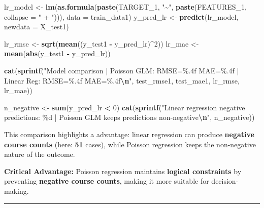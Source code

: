 \documentclass[
]{article}
\newenvironment{Shaded}{\begin{snugshade}}{\end{snugshade}}
\newcommand{\AttributeTok}[1]{\textcolor[rgb]{0.13,0.29,0.53}{#1}}
\newcommand{\DecValTok}[1]{\textcolor[rgb]{0.00,0.00,0.81}{#1}}
\newcommand{\FunctionTok}[1]{\textcolor[rgb]{0.13,0.29,0.53}{\textbf{#1}}}
\newcommand{\NormalTok}[1]{#1}
\newcommand{\OtherTok}[1]{\textcolor[rgb]{0.56,0.35,0.01}{#1}}
\newcommand{\SpecialCharTok}[1]{\textcolor[rgb]{0.81,0.36,0.00}{\textbf{#1}}}
\newcommand{\StringTok}[1]{\textcolor[rgb]{0.31,0.60,0.02}{#1}}
\begin{document}
\begin{Shaded}
\begin{Highlighting}[]
\NormalTok{lr\_model }\OtherTok{\textless{}{-}} \FunctionTok{lm}\NormalTok{(}\FunctionTok{as.formula}\NormalTok{(}\FunctionTok{paste}\NormalTok{(TARGET\_1, }\StringTok{"\textasciitilde{}"}\NormalTok{, }\FunctionTok{paste}\NormalTok{(FEATURES\_1, }\AttributeTok{collapse =} \StringTok{" + "}\NormalTok{))),}
               \AttributeTok{data =}\NormalTok{ train\_data1)}
\NormalTok{y\_pred\_lr }\OtherTok{\textless{}{-}} \FunctionTok{predict}\NormalTok{(lr\_model, }\AttributeTok{newdata =}\NormalTok{ X\_test1)}

\NormalTok{lr\_rmse }\OtherTok{\textless{}{-}} \FunctionTok{sqrt}\NormalTok{(}\FunctionTok{mean}\NormalTok{((y\_test1 }\SpecialCharTok{{-}}\NormalTok{ y\_pred\_lr)}\SpecialCharTok{\^{}}\DecValTok{2}\NormalTok{))}
\NormalTok{lr\_mae }\OtherTok{\textless{}{-}} \FunctionTok{mean}\NormalTok{(}\FunctionTok{abs}\NormalTok{(y\_test1 }\SpecialCharTok{{-}}\NormalTok{ y\_pred\_lr))}

\FunctionTok{cat}\NormalTok{(}\FunctionTok{sprintf}\NormalTok{(}\StringTok{"Model comparison | Poisson GLM: RMSE=\%.4f MAE=\%.4f | Linear Reg: RMSE=\%.4f MAE=\%.4f}\SpecialCharTok{\textbackslash{}n}\StringTok{"}\NormalTok{,}
\NormalTok{            test\_rmse1, test\_mae1, lr\_rmse, lr\_mae))}

\NormalTok{n\_negative }\OtherTok{\textless{}{-}} \FunctionTok{sum}\NormalTok{(y\_pred\_lr }\SpecialCharTok{\textless{}} \DecValTok{0}\NormalTok{)}
\FunctionTok{cat}\NormalTok{(}\FunctionTok{sprintf}\NormalTok{(}\StringTok{"Linear regression negative predictions: \%d | Poisson GLM keeps predictions non{-}negative}\SpecialCharTok{\textbackslash{}n}\StringTok{"}\NormalTok{, n\_negative))}
\end{Highlighting}
\end{Shaded}

This comparison highlights a advantage: linear regression can produce
\textbf{negative course counts} (here: \textbf{51} cases), while Poisson
regression keeps the non-negative nature of the outcome.

\textbf{Critical Advantage:} Poisson regression maintains
\textbf{logical constraints} by preventing \textbf{negative course
counts}, making it more suitable for decision-making.

\begin{center}\rule{0.5\linewidth}{0.5pt}\end{center}
\end{document}
